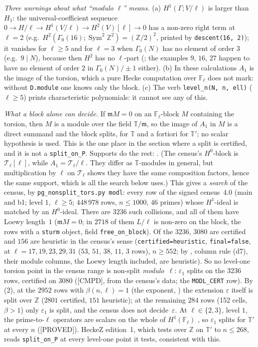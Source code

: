 \documentclass[11pt]{article}
\newcommand{\Z}{\mathbb{Z}}
\newcommand{\F}{\mathbb{F}}
\newcommand{\Sym}{\operatorname{Sym}}
\newcommand{\Ga}{\Gamma}
\newcommand{\code}[1]{\texttt{#1}}
\newcommand{\file}[1]{\texttt{#1}}
\newcommand{\PROVED}{\textsf{\small[PROVED]}}
\newcommand{\CMPD}{\textsf{\small[CMPD]}}
\begin{document}
\emph{Three warnings about what ``modulo $\ell$'' means.} (a) $H^{1}(\Ga;V/\ell)$ is larger than $H_1$: the universal-coefficient sequence $0\to H/\ell\to H^{1}(V/\ell)\to H^{2}(V)[\ell]\to0$ has a non-zero right term at $\ell=2$ (e.g.\ $H^{2}(\Ga_0(16);\Sym^{2}\Z^{2})=(\Z/2)^{2}$, printed by \code{descent(16, 2)}); it vanishes for $\ell\ge5$ and for $\ell=3$ when $\Ga_0(N)$ has no element of order $3$ (e.g.\ $9\mid N$), because then $H^{2}$ has no $\ell$-part ({}; the examples $9$, $16$, $27$ happen to have no element of order $2$ in $\Ga_0(N)/\pm1$ either). (b) In these calculations $A_1$ is the image of the torsion, which a pure Hecke computation over $\F_\ell$ does not mark: without \code{D.module} one knows only the block. (c) The verb \code{level\_n(N, n, ell)} ($\ell\ge5$) prints characteristic polynomials: it cannot see any of this.

\emph{What a block alone can decide.} If $\mathfrak mM=0$ on an $\F_\ell$-block $M$ containing the torsion, then $M$ is a module over the field $\mathbb T/\mathfrak m$, so the image of $A_1$ in $M$ is a direct summand and the block splits, for $\mathbb T$ and a fortiori for $\mathbb T'$; no scalar hypothesis is used. This is the one place in the section where a split is certified, and it is not a \code{split\_on\_P}. Supports do the rest: {}. (The census's $H^{0}$-block is $\mathcal T_\ell[\ell]$, while $A_1=\mathcal T_\ell/\ell$. They differ as $\mathbb T$-modules in general, but multiplication by $\ell$ on $\mathcal T_\ell$ shows they have the same composition factors, hence the same support, which is all the search below uses.) This gives a \emph{search} of the census, by \file{pg\_nonsplit\_tors.py modl}: every row of the signed census~4.0 (main and b1; level $1$, $\ell\ge5$; $448\,978$ rows, $n\le1000$, $46$ primes) whose $H^{1}$-ideal is matched by an $H^{0}$-ideal. There are $3236$ such collisions, and all of them have Loewy length~$1$ ($\mathfrak mM=0$; in $2718$ of them $L/\ell$ is non-zero on the block, the rows with a \code{sturm} object, field \code{free\_on\_block}). Of the $3236$, $3080$ are certified and $156$ are heuristic in the census's sense (\code{certified=heuristic}, \code{final=false}, at $\ell=17,19,23,29,31$ ($53$, $51$, $38$, $11$, $3$ rows), $n\ge552$; by {}, column rule (d7), their module columns, the Loewy length included, are heuristic). So no level-one torsion point in the census range is non-split \emph{modulo~$\ell$}: $\varepsilon_1$ splits on the $3236$ rows, certified on $3080$ (\CMPD, from the census's data; the \code{MODL\_CERT} row). By (2), at the $2952$ rows with $\beta(n,\ell)=1$ (the exponent, \cite[Thm.~4.5]{ph_ccs13}) the extension $\varepsilon$ itself is split over $\Z$ ($2801$ certified, $151$ heuristic); at the remaining $284$ rows (152 cells, $\beta>1$) only $\varepsilon_1$ is split, and the census does not decide~$\varepsilon$. At $\ell\in\{2,3\}$, level $1$, the prime-to-$\ell$ operators are scalars on the whole of $H^{1}(\F_\ell)$ {}, so $\varepsilon_1$ splits for $\mathbb T'$ at every $n$ (\PROVED). HeckeZ edition~1, which tests over $\Z$ on $\mathbb T'$ to $n\le268$, reads \code{split\_on\_P} at every level-one point it tests, consistent with this.
\end{document}
